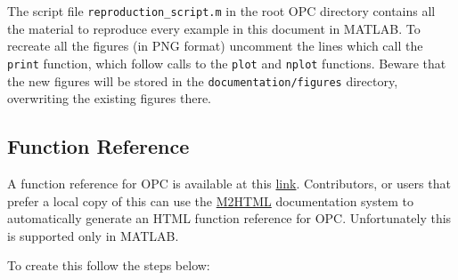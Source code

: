 \documentclass{book}
\begin{document}
The script file {\tt reproduction\_script.m} in the root OPC directory
contains all the material to reproduce every example in this
document in MATLAB. To recreate all the figures (in PNG format) uncomment the
lines which call the {\tt print} function, which follow 
calls to the 
{\tt plot} and {\tt nplot} functions. Beware that the new figures
will be stored in the {\tt documentation/figures} directory,
overwriting the existing figures there.


\subsection{Function Reference}\label{sec:htmlref}

A function reference for OPC is available at this
%
\href{http://www.lancaster.ac.uk/staff/pavlidin/software/opc/documentation/reference/index.html}{link}.
%
Contributors, or users that prefer a local copy of this can use the 
%
\href{https://www.artefact.tk/software/matlab/m2html/}{M2HTML}
%
documentation system to automatically generate an HTML function reference for
OPC. Unfortunately this is supported only in MATLAB.

To create this follow the steps below:
\end{document}
